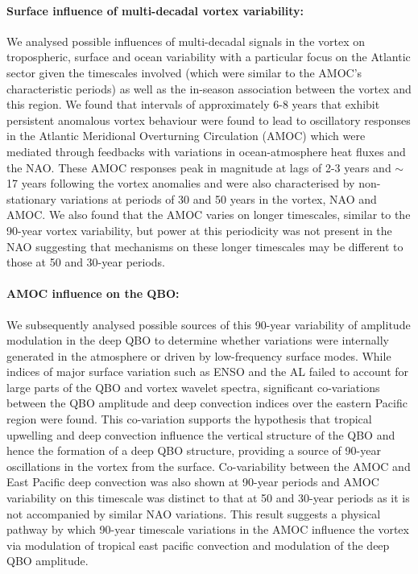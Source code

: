 \paragraph{Surface influence of multi-decadal vortex variability:}
We analysed possible influences of multi-decadal signals in the vortex on tropospheric, surface and ocean variability with a particular focus on the Atlantic sector given the timescales involved (which were similar to the AMOC's characteristic periods) as well as the in-season association between the vortex and this region. We found that intervals of approximately 6-8 years that exhibit persistent anomalous vortex behaviour were found to lead to oscillatory responses in the Atlantic Meridional Overturning Circulation (AMOC) which were mediated through feedbacks with variations in ocean-atmosphere heat fluxes and the NAO. These AMOC responses peak in magnitude at lags of 2-3 years and $\sim$17 years following the vortex anomalies and were also characterised by non-stationary variations at periods of 30 and 50 years in the vortex, NAO and AMOC. We also found that the AMOC varies on longer timescales, similar to the 90-year vortex variability, but power at this periodicity was not present in the NAO suggesting that mechanisms on these longer timescales may be different to those at 50 and 30-year periods. 

\paragraph{AMOC influence on the QBO:}
We subsequently analysed possible sources of this 90-year variability of amplitude modulation in the deep QBO to determine whether variations were internally generated in the atmosphere or driven by low-frequency surface modes. While indices of major surface variation such as ENSO and the AL failed to account for large parts of the QBO and vortex wavelet spectra, significant co-variations between the QBO amplitude and deep convection indices over the eastern Pacific region were found. This co-variation supports the hypothesis that tropical upwelling and deep convection influence the vertical structure of the QBO and hence the formation of a deep QBO structure, providing a source of 90-year oscillations in the vortex from the surface. Co-variability between the AMOC and East Pacific deep convection was also shown at 90-year periods and AMOC variability on this timescale was distinct to that at 50 and 30-year periods as it is not accompanied by similar NAO variations. This result suggests a physical pathway by which 90-year timescale variations in the AMOC influence the vortex via modulation of tropical east pacific convection and modulation of the deep QBO amplitude. 

